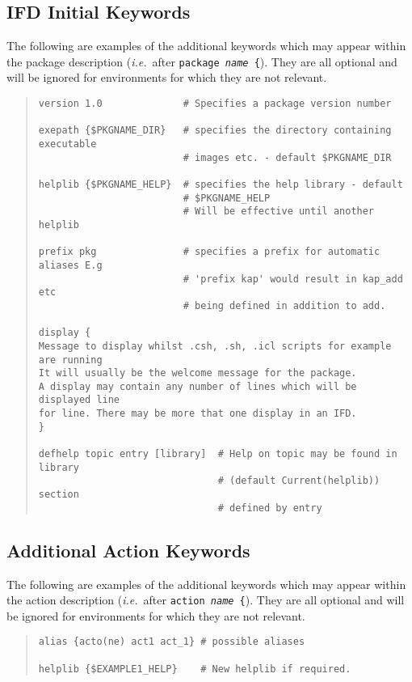 \documentclass[twoside,11pt]{article}
\newcommand{\xlabel}[1]{}
\begin{document}
\subsection{\xlabel{ifd_initial_keywords}IFD Initial Keywords}
The following are examples of the additional keywords which may appear within 
the package description (\textit{i.e.}\ after \texttt{package \textit{name} 
\{}). 
They are all optional and will be ignored for environments for which they are 
not relevant. 
\begin{quote} \begin{verbatim}
version 1.0              # Specifies a package version number

exepath {$PKGNAME_DIR}   # specifies the directory containing executable
                         # images etc. - default $PKGNAME_DIR

helplib {$PKGNAME_HELP}  # specifies the help library - default 
                         # $PKGNAME_HELP
                         # Will be effective until another helplib

prefix pkg               # specifies a prefix for automatic aliases E.g
                         # 'prefix kap' would result in kap_add etc
                         # being defined in addition to add.

display {                 
Message to display whilst .csh, .sh, .icl scripts for example are running
It will usually be the welcome message for the package.
A display may contain any number of lines which will be displayed line
for line. There may be more that one display in an IFD.
}

defhelp topic entry [library]  # Help on topic may be found in library
                               # (default Current(helplib)) section 
                               # defined by entry
\end{verbatim} \end{quote}

\subsection{\xlabel{additional_action_keywords}\label{add_act}Additional 
Action Keywords}
The following are examples of the additional keywords which may appear within
the action description (\textit{i.e.}\ after \texttt{action \textit{name} \{}). 
They are all optional and will be ignored for environments for which they are 
not relevant. 
\begin{quote} \begin{verbatim}
alias {acto(ne) act1 act_1} # possible aliases

helplib {$EXAMPLE1_HELP}    # New helplib if required.
\end{verbatim} \end{quote}
\end{document}
